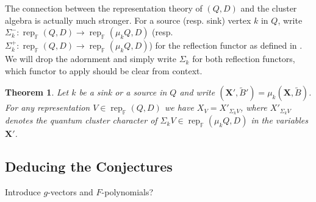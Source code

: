 \documentclass{amsart}
\newtheorem{theorem}{Theorem}
\newcommand{\bfX}{\mathbf{X}}
\newcommand{\FF}{\mathbb{F}}
\newcommand{\rep}{\operatorname{rep}}
\begin{document}
  The connection between the representation theory of $(Q,D)$ and the cluster algebra is actually much stronger.  For a source (resp. sink) vertex $k$ in $Q$, write $\Sigma_k^-:\rep_\FF(Q,D)\to\rep_\FF(\mu_kQ,D)$ (resp. $\Sigma_k^+:\rep_\FF(Q,D)\to\rep_\FF(\mu_kQ,D)$) for the reflection functor as defined in \cite[Sec. 2]{dlab-ringel}.  
  We will drop the adornment and simply write $\Sigma_k$ for both reflection functors, which functor to apply should be clear from context.
  \begin{theorem}\cite{rupel1}\label{th:reflection functor}
    Let $k$ be a sink or a source in $Q$ and write $(\bfX',\tilde B')=\mu_k(\bfX,\tilde B)$.  
    For any representation $V\in\rep_\FF(Q,D)$ we have $X_V=X'_{\Sigma_kV}$, where $X'_{\Sigma_kV}$ denotes the quantum cluster character of $\Sigma_kV\in\rep_\FF(\mu_kQ,D)$ in the variables $\bfX'$.
  \end{theorem}

  \subsection{Deducing the Conjectures}
  Introduce $g$-vectors and $F$-polynomials?
\end{document}

